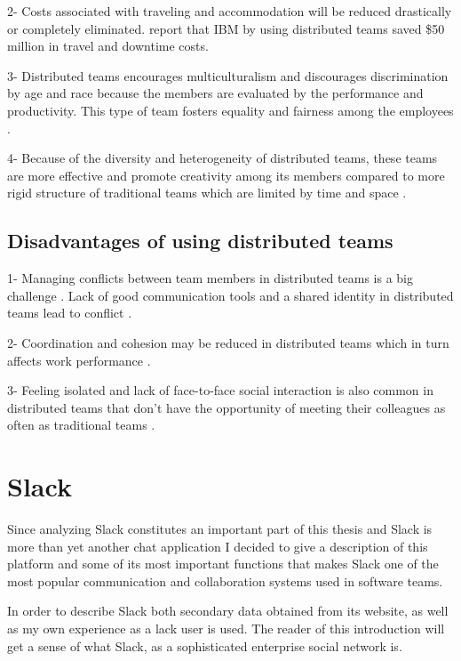 2- Costs associated with traveling and accommodation will be reduced drastically or completely eliminated. \citet{Baskerville2007} report that IBM by using distributed teams saved \$50 million in travel and downtime costs.

3- Distributed teams encourages multiculturalism and discourages discrimination by age and race because the members are evaluated by the performance and productivity. This type of team fosters equality and fairness among the employees \citep{Bergiel2007}.

4- Because of the diversity and heterogeneity of distributed teams, these teams are more effective and promote creativity among its members compared to more rigid structure of traditional teams which are limited by time and space \citep{Bergiel2008}.
\subsection{Disadvantages of using distributed teams}
1- Managing conflicts between team members in distributed teams is a big challenge \citep{Hinds2003}. Lack of good communication tools and a shared identity in distributed teams lead to conflict \citep{Hinds2005a}. 

2- Coordination and cohesion may be reduced in distributed teams which in turn affects work performance \citep{DeRosa2004}.

3- Feeling isolated and lack of face-to-face social interaction is also common in distributed teams that don't have the opportunity of meeting their colleagues as often as traditional teams \citep{Kiesler2002}.

\section{Slack} \label{slack}
Since analyzing Slack constitutes an important part of this thesis and Slack is more than yet another chat application I decided to give a description of this platform and some of its most important functions that makes Slack one of the most popular communication and collaboration systems used in software teams.

In order to describe Slack both secondary data obtained from its website, as well as my own experience as a lack user is used. The reader of this introduction will get a sense of what Slack, as a sophisticated enterprise social network is.

